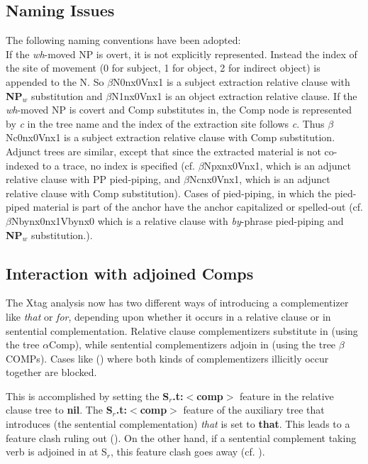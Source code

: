 \subsection{Naming Issues}
The following naming conventions have been adopted:\\ 
If the {\em wh}-moved NP is overt, it is not explicitly 
represented. Instead the index of the site of movement
(0 for subject, 1 for object, 2 for indirect object) is appended to the
N. So $\beta$N0nx0Vnx1 is a subject
extraction relative clause with {\bf NP$_{w}$} substitution
and $\beta$N1nx0Vnx1 is an object extraction
relative clause. If the {\em wh}-moved NP is covert and Comp substitutes
in, the Comp node is represented by {\em c} in the tree name and the 
index of the extraction site follows {\em c}. Thus 
$\beta$Nc0nx0Vnx1 is a subject extraction
relative clause with Comp substitution. Adjunct trees are similar, except
that since the extracted material is not co-indexed to a trace, no index
is specified (cf. $\beta$Npxnx0Vnx1, which is an adjunct relative clause with
PP pied-piping, and $\beta$Ncnx0Vnx1, which is an adjunct relative clause
with Comp substitution). Cases of pied-piping, in which the pied-piped 
material is part of the anchor have the anchor capitalized or spelled-out
(cf. $\beta$Nbynx0nx1Vbynx0 which is a relative clause with {\em by}-phrase
pied-piping and {\bf NP$_{w}$} substitution.).

\subsection{Interaction with adjoined Comps}
The Xtag analysis now has two different ways of introducing a 
complementizer like {\em that} or {\em for}, depending upon whether
it occurs in a relative clause or in sentential complementation. 
Relative clause complementizers substitute in (using the
tree $\alpha$Comp), while sentential complementizers adjoin in
(using the tree $\beta$COMPs). Cases like () where 
both kinds of complementizers illicitly occur together are blocked.


This is accomplished by setting the {\bf S$_{r}$.t:$<$comp$>$} feature
in the relative clause tree to {\bf nil}. The {\bf S$_{r}$.t:$<$comp$>$} 
feature of the auxiliary tree that introduces 
(the sentential complementation) {\em that} is set to
{\bf that}. This leads to a feature clash ruling out (). On the
other hand, if a sentential complement taking verb is adjoined
in at S$_{r}$, this feature clash goes away (cf. ).

